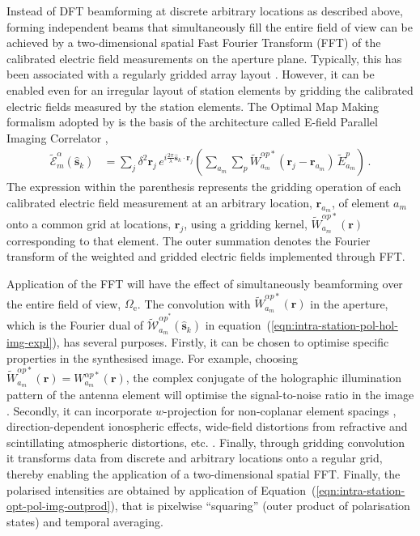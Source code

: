 \documentclass[
  journal=pasa,
  manuscript=article-type,
  year=2020,
  volume=37,
]{cup-journal}
\begin{document}
Instead of DFT beamforming at discrete arbitrary locations as described above, forming independent beams that simultaneously fill the entire field of view can be achieved by a two-dimensional spatial Fast Fourier Transform (FFT) of the calibrated electric field measurements on the aperture plane. Typically, this has been associated with a regularly gridded array layout \citep{Daishido+1991,Otobe+1994,Tegmark+2009,Tegmark+2010,Foster+2014,Masui+2019}. However, it can be enabled even for an irregular layout of station elements by gridding the calibrated electric fields measured by the station elements. The Optimal Map Making \citep[OMM;][]{Tegmark1997a} formalism adopted by \citet{Morales2011} is the basis of the architecture called E-field Parallel Imaging Correlator \cite[EPIC;][]{Thyagarajan+2017},
\begin{align}
    \widetilde{\mathcal{E}}_m^\alpha(\hat{\boldsymbol{s}}_k) &= \sum_j \delta^2 \boldsymbol{r}_j \, e^{i\frac{2\pi}{\lambda} \hat{\boldsymbol{s}}_k\cdot\boldsymbol{r}_j} \left(\sum_{a_m} \sum_p \widetilde{W}_{a_m}^{\alpha p*}(\boldsymbol{r}_j-\boldsymbol{r}_{a_m}) \, \widetilde{E}_{a_m}^p \right) \, . \label{eqn:intra-station-pol-hol-img-epic}
\end{align}
The expression within the parenthesis represents the gridding operation of each calibrated electric field measurement at an arbitrary location, $\boldsymbol{r}_{a_m}$, of element $a_m$ onto a common grid at locations, $\boldsymbol{r}_j$, using a gridding kernel, $\widetilde{W}_{a_m}^{\alpha p*}(\boldsymbol{r})$ corresponding to that element. The outer summation denotes the Fourier transform of the weighted and gridded electric fields implemented through FFT. 

Application of the FFT will have the effect of simultaneously beamforming over the entire field of view, $\Omega_\textrm{e}$. The convolution with $\widetilde{W}_{a_m}^{\alpha p*}(\boldsymbol{r})$ in the aperture, which is the Fourier dual of $\widetilde{\mathcal{W}}_{a_m}^{{\alpha p}^*}(\hat{\boldsymbol{s}}_k)$ in equation~(\ref{eqn:intra-station-pol-hol-img-expl}), has several purposes. Firstly, it can be chosen to optimise specific properties in the synthesised image. For example, choosing $\widetilde{W}_{a_m}^{\alpha p*}(\boldsymbol{r})=W_{a_m}^{\alpha p*}(\boldsymbol{r})$, the complex conjugate of the holographic illumination pattern of the antenna element will optimise the signal-to-noise ratio in the image \citep{Morales2011}. Secondly, it can incorporate $w$-projection for non-coplanar element spacings \citep{Cornwell+2008}, direction-dependent ionospheric effects, wide-field distortions from refractive and scintillating atmospheric distortions, etc. \citep{Morales+2009,Morales2011}. Finally, through gridding convolution it transforms data from discrete and arbitrary locations onto a regular grid, thereby enabling the application of a two-dimensional spatial FFT. Finally, the polarised intensities are obtained by application of Equation~(\ref{eqn:intra-station-opt-pol-img-outprod}), that is pixelwise ``squaring'' (outer product of polarisation states) and temporal averaging.
\end{document}
